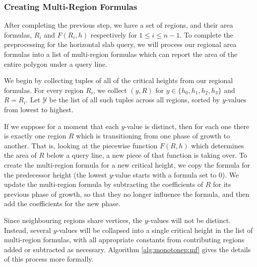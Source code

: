 \subsubsection{Creating Multi-Region Formulas}
\label{sec:mr_formula}

After completing the previous step, we have a set of regions, and their area 
formulas, $R_i$ and $F(R_i, h)$ respectively for $1 \leq i \leq n-1$.
To complete the preprocessing for the horizontal slab query, we will process our 
regional area formulas into a list of multi-region formulas which can report the 
area of the entire polygon under a query line.

We begin by collecting tuples of all of the critical heights from our regional 
formulas. 
For every region $R_i$, we collect $(y, R)$ for $y \in \{h_0, h_1, h_2, h_3\}$ 
and $R = R_i$.
Let $\mathcal{Y}$ be the list of all such tuples across all regions, sorted by 
$y$-values from lowest to highest.

If we suppose for a moment that each $y$-value is distinct, then for each one 
there is exactly one region $R$ which is transitioning from one phase of growth 
to another.
That is, looking at the piecewise function $F(R, h)$ which determines the area 
of $R$ below a query line, a new piece of that function is taking over.
To create the multi-region formula for a new critical height, we copy the 
formula for the predecessor height (the lowest $y$-value starts with a formula 
set to 0).
We update the multi-region formula by subtracting the coefficients of $R$ for its 
previous phase of growth, so that they no longer influence the formula, and then 
add the coefficients for the new phase.

Since neighbouring regions share vertices, the $y$-values will not be distinct.
Instead, several $y$-values will be collapsed into a single critical height in 
the list of multi-region formulas, with all appropriate constants from 
contributing regions added or subtracted as necessary.
Algorithm \ref{alg:monotonep:mf} gives the details of this process more 
formally.

